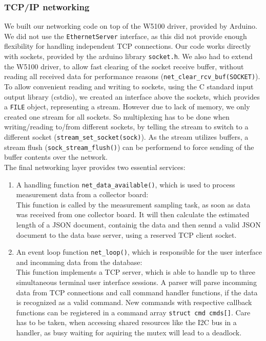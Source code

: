 \documentclass[a4paper]{scrreprt}
\begin{document}
\subsubsection{TCP/IP networking}
We built our networking code on top of the W5100 driver, provided by Arduino. We did not use the \texttt{EthernetServer} interface, as
this did not provide enough flexibility for handling independent TCP connections. Our code works directly with sockets, provided by
the arduino library \texttt{socket.h}. We also had to extend the W5100 driver, to allow fast clearing of the socket receive buffer,
without reading all received data for performance reasons (\texttt{net\_clear\_rcv\_buf(SOCKET)}).\\
To allow convenient reading and writing to sockets, using the C standard input output library (cstdio), we created an interface
above the sockets, which provides a \texttt{FILE} object, representing a stream. However due to lack of memory, we only created one
stream for all sockets. So multiplexing has to be done when writing/reading to/from different sockets, by telling the stream to switch
to a different socket (\texttt{stream\_set\_socket(sock)}). As the stream utilizes buffers, a stream flush (\texttt{sock\_stream\_flush()})
can be performend to force sending of the buffer contents over the network.\\
The final networking layer provides two essential services:
\begin{enumerate}
  \item A handling function \texttt{net\_data\_available()}, which is used to process measurement data from a collector board:\\
    This function is called by the measurement sampling task, as soon as data was received from one collector board. It will then
    calculate the estimated length of a JSON document, containig the data and then sennd a valid JSON document to the data base
    server, using a reserved TCP client socket.
  \item An event loop function \texttt{net\_loop()}, which is responsible for the user interface and incomming data from the database:\\
    This function implements a TCP server, which is able to handle up to three simultaneous terminal user interface sessions. A parser
    will parse incomming data from TCP connections and call command handler functions, if the data is recognized as a valid command.
    New commands with respective callback functions can be registered in a command array \texttt{struct cmd cmds[]}. Care has to be
    taken, when accessing shared resources like the I2C bus in a handler, as busy waiting for aquiring the mutex will lead to a deadlock.
\end{enumerate}
\end{document}

